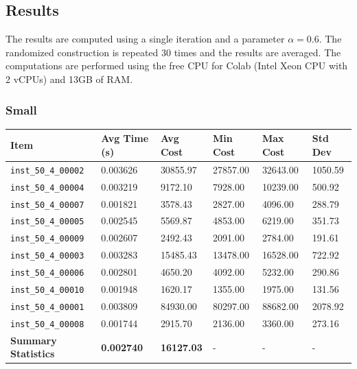 \documentclass{article}
\begin{document}
\subsection*{Results}
The results are computed using a single iteration and a parameter $\alpha = 0.6$. The randomized construction is repeated 30 times and the results are averaged. The computations are performed using the free CPU for Colab (Intel Xeon CPU with 2 vCPUs) and 13GB of RAM.

\subsubsection*{Small}


\begin{table}[H]
\centering
\hspace*{-1.5cm}
\begin{tabular}{llllll}
\toprule
\textbf{Item} & \textbf{Avg Time (s)} & \textbf{Avg Cost} & \textbf{Min Cost} & \textbf{Max Cost} & \textbf{Std Dev} \\
\midrule
\texttt{inst\_50\_4\_00002} & 0.003626 & 30855.97 & 27857.00 & 32643.00 & 1050.59 \\
\texttt{inst\_50\_4\_00004} & 0.003219 & 9172.10  & 7928.00  & 10239.00 & 500.92  \\
\texttt{inst\_50\_4\_00007} & 0.001821 & 3578.43  & 2827.00  & 4096.00  & 288.79  \\
\texttt{inst\_50\_4\_00005} & 0.002545 & 5569.87  & 4853.00  & 6219.00  & 351.73  \\
\texttt{inst\_50\_4\_00009} & 0.002607 & 2492.43  & 2091.00  & 2784.00  & 191.61  \\
\texttt{inst\_50\_4\_00003} & 0.003283 & 15485.43 & 13478.00 & 16528.00 & 722.92  \\
\texttt{inst\_50\_4\_00006} & 0.002801 & 4650.20  & 4092.00  & 5232.00  & 290.86  \\
\texttt{inst\_50\_4\_00010} & 0.001948 & 1620.17  & 1355.00  & 1975.00  & 131.56  \\
\texttt{inst\_50\_4\_00001} & 0.003809 & 84930.00 & 80297.00 & 88682.00 & 2078.92 \\
\texttt{inst\_50\_4\_00008} & 0.001744 & 2915.70  & 2136.00  & 3360.00  & 273.16  \\
\midrule
\textbf{Summary Statistics} & \textbf{0.002740} & \textbf{16127.03} & - & - & - \\
\bottomrule
\end{tabular}
\label{tab:performance_metrics_randomized}
\end{table}
\end{document}
